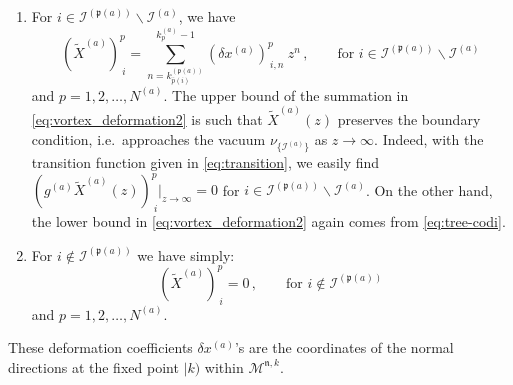 \documentclass[12pt,a4paper]{article}
\newcommand{\nn}{\mathfrak{n}}
\renewcommand{\(}{\left(}
\renewcommand{\)}{\right)}
\renewcommand{\(}{\left(}
\renewcommand{\)}{\right)}
\begin{document}
\begin{enumerate}
\begin{enumerate}
\item For $i\in \mathcal{I}^{(\mathfrak{p}(a))}\backslash \mathcal{I}^{(a)}$, we have
\begin{equation}\label{eq:vortex_deformation2}
(\tilde{X}^{(a)})^p_{\ i}= \sum_{n=k^{(\mathfrak{p}(a))}_{\bar{p}(i)}}^{k^{(a)}_p-1} (\delta x^{(a)})^p_{\ i,n}\ z^n\,,\qquad \text{for }
i\in \mathcal{I}^{(\mathfrak{p}(a))}\backslash \mathcal{I}^{(a)}\,
\end{equation}
and $p=1,2,\dots,N^{(a)}$. 
The upper bound of the summation in \eqref{eq:vortex_deformation2} is such that $\tilde{X}^{(a)}(z)$ preserves the boundary condition, i.e.\ approaches the vacuum $\nu_{\{\mathcal{I}^{(a)}\}}$ as $z\to\infty$. 
Indeed, with the transition function given in \eqref{eq:transition}, we easily find $(g^{(a)}\tilde{X}^{(a)}(z))^p_{\ i}|_{z\to\infty}=0$ for $i\in \mathcal{I}^{(\mathfrak{p}(a))}\backslash \mathcal{I}^{(a)}$. 
On the other hand, the lower bound in \eqref{eq:vortex_deformation2} again comes from \eqref{eq:tree-codi}.

\item For $i\notin \mathcal{I}^{(\mathfrak{p}(a))}$ we have simply:
\begin{equation}\label{eq:vortex_deformation3}
(\tilde{X}^{(a)})^p_{\ i}=0\,,\qquad 
\text{for }
i\notin \mathcal{I}^{(\mathfrak{p}(a))}\,
\end{equation}
and $p=1,2,\dots,N^{(a)}$.
\end{enumerate}
These deformation coefficients $\delta x^{(a)}$'s are the coordinates of the normal directions at the fixed point $|k)$ within $\mathcal{M}^{\nn,k}$. 
\end{enumerate}


\medskip
\end{document}
